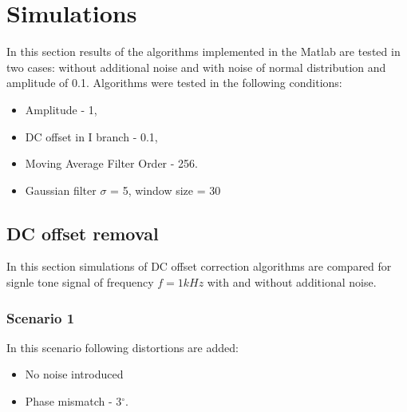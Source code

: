 \documentclass[en,printmode]{mgr}
\begin{document}
	\section{Simulations}
		In this section results of the algorithms implemented in the Matlab are
		tested in two cases: without additional noise and with noise of normal distribution and 
		amplitude of 0.1.
		Algorithms were tested in the following conditions:
		\begin{itemize}
			\item Amplitude - 1,
			\item DC offset in I branch - 0.1,
			\item Moving Average Filter Order - 256.
			\item Gaussian filter $\sigma$ = 5, window size = 30
		\end{itemize}
		\subsection*{DC offset removal}
		In this section simulations of DC offset correction algorithms are compared for signle tone
		signal of frequency $f=1kHz$ with and without additional noise.

		\subsubsection*{Scenario 1}
		In this scenario following distortions are added:
		\begin{itemize}
			\item No noise introduced
			\item Phase mismatch - 3$^\circ$.
		\end{itemize}
	
\end{document}
